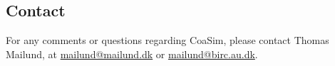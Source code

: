 \documentclass{manual}
\begin{document}
\begin{empfile}

\section{Contact}
\label{sec:contact}

For any comments or questions regarding CoaSim, please contact Thomas
Mailund, at \href{mailto:mailund@mailund.dk}{mailund@mailund.dk} or
\href{mailund@birc.au.dk}{mailund@birc.au.dk}.


\end{empfile}
\end{document}
